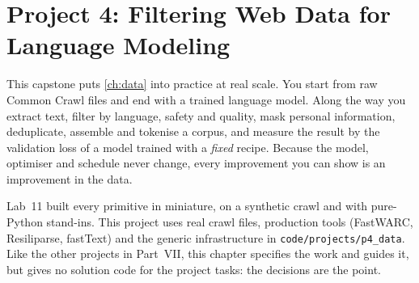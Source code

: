 \chapter{Project 4: Filtering Web Data for Language Modeling}\label{ch:proj4}

This capstone puts \cref{ch:data} into practice at real scale. You start from raw Common Crawl
files and end with a trained language model. Along the way you extract text, filter by language,
safety and quality, mask personal information, deduplicate, assemble and tokenise a corpus, and
measure the result by the validation loss of a model trained with a \emph{fixed} recipe. Because the
model, optimiser and schedule never change, every improvement you can show is an improvement in the
data.

Lab~11 built every primitive in miniature, on a synthetic crawl and with pure-Python stand-ins.
This project uses real crawl files, production tools (FastWARC, Resiliparse, fastText) and the
generic infrastructure in \texttt{code/projects/p4\_data}. Like the other projects in Part~VII, this
chapter specifies the work and guides it, but gives no solution code for the project tasks: the
decisions are the point.

